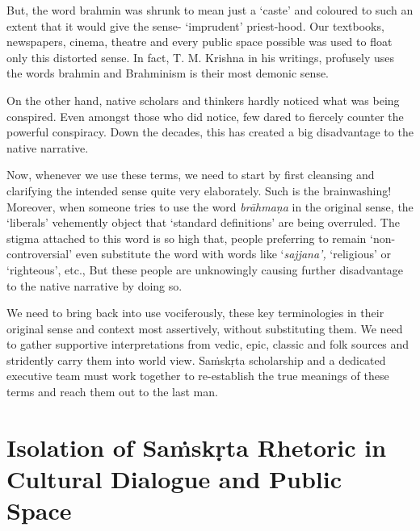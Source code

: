 But, the word brahmin was shrunk to mean just a ‘caste’ and coloured to such an extent that it would give the sense- ‘imprudent’ priest-hood. Our textbooks, newspapers, cinema, theatre and every public space possible was used to float only this distorted sense. In fact, T. M. Krishna in his writings, profusely uses the words brahmin and Brahminism is their most demonic sense.

On the other hand, native scholars and thinkers hardly noticed what was being conspired. Even amongst those who did notice, few dared to fiercely counter the powerful conspiracy. Down the decades, this has created a big disadvantage to the native narrative.

Now, whenever we use these terms, we need to start by first cleansing and clarifying the intended sense quite very elaborately. Such is the brainwashing! Moreover, when someone tries to use the word \textit{brāhmaṇa} in the original sense, the ‘liberals’ vehemently object that ‘standard definitions’ are being overruled. The stigma attached to this word is so high that, people preferring to remain ‘non-controversial’ even substitute the word with words like ‘\textit{sajjana’,} ‘religious’ or ‘righteous’, etc., But these people are unknowingly causing further disadvantage to the native narrative by doing so.

We need to bring back into use vociferously, these key terminologies in their original sense and context most assertively, without substituting them. We need to gather supportive interpretations from vedic, epic, classic and folk sources and stridently carry them into world view. Saṁskṛta scholarship and a dedicated executive team must work together to re-establish the true meanings of these terms and reach them out to the last man.

\vspace{-.3cm}

\section*{Isolation of Saṁskṛta Rhetoric in Cultural Dialogue and Public Space}

